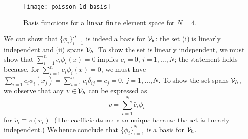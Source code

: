 \begin{figure}
  \centering
  \texttt{[image: poisson\_1d\_basis]}
  \caption{Basis functions for a linear finite element space for $N = 4$.}
  \label{fig:pos1d_basis}
\end{figure}

We can show that $\{ \phi_i \}_{i=1}^N$ is indeed a basis for $\mathcal{V}_h$: the set (i) is linearly independent and (ii) spans $\mathcal{V}_h$. To show the set is linearly independent, we must show that $\sum_{i=1}^n c_i \phi_i(x) = 0$ implies $c_i = 0$, $i = 1,\dots,N$; the statement holds because, for $\sum_{i=1}^n c_i \phi_i(x) = 0$, we must have $\sum_{i=1}^n c_i \phi_i(x_j) = \sum_{i=1}^n c_i \delta_{ij} = c_j = 0$, $j = 1,\dots,N$. To show the set spans $\mathcal{V}_h$, we observe that any $v \in \mathcal{V}_h$ can be expressed as
\begin{equation*}
  v = \sum_{i=1}^N \hat v_i \phi_i
\end{equation*}
for $\hat v_i \equiv v(x_i)$. (The coefficients are also unique because the set is linearly independent.)  We hence conclude that $\{\phi_i\}_{i=1}^N$ is a basis for $\mathcal{V}_h$. 



